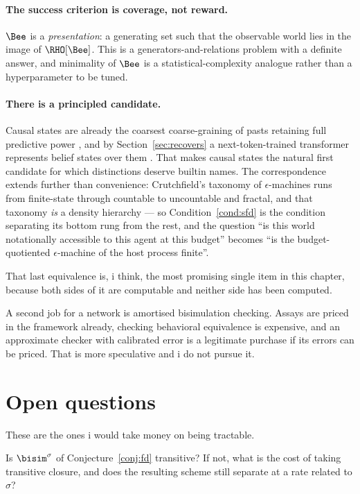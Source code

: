 \paragraph{The success criterion is coverage, not reward.}
$\Bee$ is a \emph{presentation}: a generating set such that the
observable world lies in the image of $\RHO[\Bee]$.
This is a generators-and-relations problem with a definite answer,
and minimality of $\Bee$ is a statistical-complexity analogue
rather than a hyperparameter to be tuned.

\paragraph{There is a principled candidate.}
Causal states are already the coarsest coarse-graining of pasts
retaining full predictive power \cite{shalizi2001}, and by
Section~\ref{sec:recovers} a next-token-trained transformer
represents belief states over them \cite{shai2024}.
That makes causal states the natural first candidate for which
distinctions deserve builtin names.
The correspondence extends further than convenience: Crutchfield's
taxonomy of $\epsilon$-machines runs from finite-state through
countable to uncountable and fractal, and that taxonomy \emph{is} a
density hierarchy --- so Condition~\ref{cond:sfd} is the condition
separating its bottom rung from the rest, and the question ``is
this world notationally accessible to this agent at this budget''
becomes ``is the budget-quotiented $\epsilon$-machine of the host
process finite''.

That last equivalence is, i think, the most promising single item
in this chapter, because both sides of it are computable and
neither side has been computed.

A second job for a network is amortised bisimulation checking.
Assays are priced in the framework already, checking behavioral
equivalence is expensive, and an approximate checker with
calibrated error is a legitimate purchase if its errors can be
priced.
That is more speculative and i do not pursue it.

\section{Open questions}
\label{sec:notation-open}

These are the ones i would take money on being tractable.

\begin{question}
\label{q:trans}
Is $\bisim^{\sigma}$ of Conjecture~\ref{conj:fd} transitive?
If not, what is the cost of taking transitive closure, and does the
resulting scheme still separate at a rate related to $\sigma$?
\end{question}

